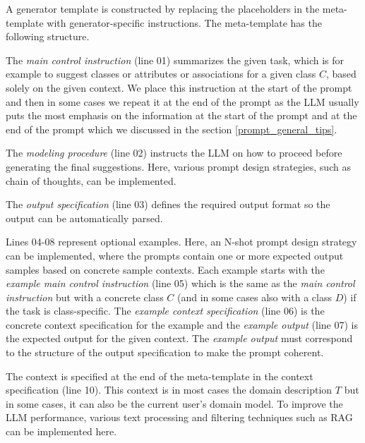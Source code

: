 A generator template is constructed by replacing the placeholders in the meta-template with generator-specific instructions. The meta-template has the following structure.

The \textit{main control instruction} (line 01) summarizes the given task, which is for example to suggest classes or attributes or associations for a given class $C$, based solely on the given context. We place this instruction at the start of the prompt and then in some cases we repeat it at the end of the prompt as the LLM usually puts the most emphasis on the information at the start of the prompt and at the end of the prompt which we discussed in the section \ref{prompt_general_tips}.

The \textit{modeling procedure} (line 02) instructs the LLM on how to proceed before generating the final suggestions. Here, various prompt design strategies, such as chain of thoughts, can be implemented.

The \textit{output specification} (line 03) defines the required output format so the output can be automatically parsed.

Lines 04-08 represent optional examples. Here, an N-shot prompt design strategy can be implemented, where the prompts contain one or more expected output samples based on concrete sample contexts. Each example starts with the \textit{example main control instruction} (line 05) which is the same as the \textit{main control instruction} but with a concrete class $C$ (and in some cases also with a class $D$) if the task is class-specific. The \textit{example context specification} (line 06) is the concrete context specification for the example and the \textit{example output} (line 07) is the expected output for the given context. The \textit{example output} must correspond to the structure of the output specification to make the prompt coherent.

The context is specified at the end of the meta-template in the context specification (line 10). This context is in most cases the domain description $T$ but in some cases, it can also be the current user's domain model. To improve the LLM performance, various text processing and filtering techniques such as RAG can be implemented here.